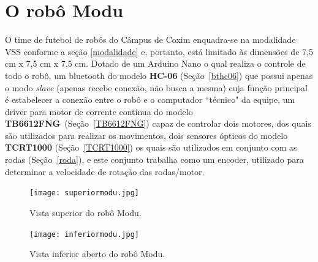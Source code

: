 \documentclass[a4paper,12pt,portuguese]{ufms-cpcx}
\begin{document}
\chapter{O robô Modu}
O time de futebol de robôs do Câmpus de Coxim enquadra-se na modalidade VSS conforme a seção \ref{modalidade} e, portanto, está limitado às dimensões de 7,5 cm x 7,5 cm x 7,5 cm. Dotado de um Arduino Nano o qual realiza o controle de todo o robô, um bluetooth do modelo \textbf{HC-06} (Seção~\ref{bthc06}) que possui apenas o modo \textit{slave} (apenas recebe conexão, não busca a mesma) cuja função principal é estabelecer a conexão entre o robô e o computador ``técnico" da equipe, um driver para motor de corrente contínua do modelo \textbf{TB6612FNG}~(Seção~\ref{TB6612FNG}) capaz de controlar dois motores, dos quais são utilizados para realizar os movimentos, dois sensores ópticos do modelo \textbf{TCRT1000} (Seção~\ref{TCRT1000}) os quais são utilizados em conjunto com as rodas (Seção~\ref{roda}), e este conjunto trabalha como um encoder, utilizado para determinar a velocidade de rotação das rodas/motor.
\begin{figure}[H]
	\centering
	\texttt{[image: superiormodu.jpg]}
	\caption{Vista superior do robô Modu.}
\end{figure}
\begin{figure}[H]
	\centering
	\texttt{[image: inferiormodu.jpg]}
	\caption{Vista inferior aberto do robô Modu.}
\end{figure}
\end{document}

